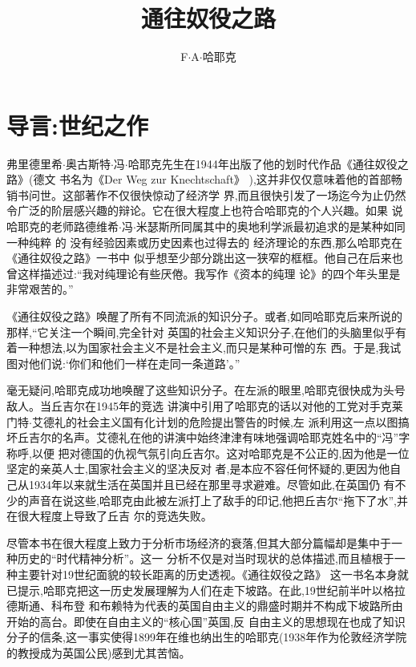﻿\documentclass[12pt]{article}
\title{通往奴役之路}
\author{F$\cdot$A$\cdot$哈耶克}
\date{}
\begin{document}
\cfoot{\textsf{\thepage}}

\maketitle

\pagebreak

\tableofcontents

\setcounter{page}{1}

\section{导言:世纪之作}

弗里德里希$\cdot$奥古斯特$\cdot$冯$\cdot$哈耶克先生在1944年出版了他的划时代作品《通往奴役之路》(德文
书名为《Der Weg zur Knechtschaft》 ),这并非仅仅意味着他的首部畅销书问世。这部著作不仅很快惊动了经济学
界,而且很快引发了一场迄今为止仍然令广泛的阶层感兴趣的辩论。它在很大程度上也符合哈耶克的个人兴趣。如果
说哈耶克的老师路德维希$\cdot$冯$\cdot$米瑟斯所同属其中的奥地利学派最初追求的是某种如同一种纯粹
的 \myrule 没有经验因素或历史因素也过得去的 \myrule 经济理论的东西,那么哈耶克在《通往奴役之路》一书中
似乎想至少部分跳出这一狭窄的框框。他自己在后来也曾这样描述过:``我对纯理论有些厌倦。我写作《资本的纯理
论》的四个年头里是非常艰苦的。''

《通往奴役之路》唤醒了所有不同流派的知识分子。或者,如同哈耶克后来所说的那样,``它关注一个瞬间,完全针对
英国的社会主义知识分子,在他们的头脑里似乎有着一种想法,以为国家社会主义不是社会主义,而只是某种可憎的东
西。于是,我试图对他们说:‘你们和他们一样在走同一条道路’。''

毫无疑问,哈耶克成功地唤醒了这些知识分子。在左派的眼里,哈耶克很快成为头号敌人。当丘吉尔在1945年的竞选
讲演中引用了哈耶克的话以对他的工党对手克莱门特$\cdot$艾德礼的社会主义国有化计划的危险提出警告的时候,左
派利用这一点以图搞坏丘吉尔的名声。艾德礼在他的讲演中始终津津有味地强调哈耶克姓名中的``冯''字称呼,以便
把对德国的仇视气氛引向丘吉尔。这对哈耶克是不公正的,因为他是一位坚定的亲英人士,国家社会主义的坚决反对
者,是本应不容任何怀疑的,更因为他自己从1934年以来就生活在英国并且已经在那里寻求避难。尽管如此,在英国仍
有不少的声音在说这些,哈耶克由此被左派打上了敌手的印记,他把丘吉尔``拖下了水'',并在很大程度上导致了丘吉
尔的竞选失败。

尽管本书在很大程度上致力于分析市场经济的衰落,但其大部分篇幅却是集中于一种历史的``时代精神分析''。这一
分析不仅是对当时现状的总体描述,而且植根于一种主要针对19世纪面貌的较长距离的历史透视。《通往奴役之路》
这一书名本身就已提示,哈耶克把这一历史发展理解为人们在走下坡路。在此,19世纪前半叶以格拉德斯通、科布登
和布赖特为代表的英国自由主义的鼎盛时期并不构成下坡路所由开始的高台。即使在自由主义的``核心国''英国,反
自由主义的思想现在也成了知识分子的信条,这一事实使得1899年在维也纳出生的哈耶克(1938年作为伦敦经济学院
的教授成为英国公民)感到尤其苦恼。
\end{document}
